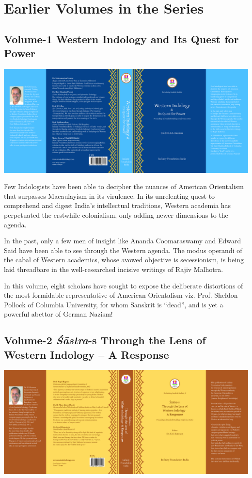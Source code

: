 
\chapter*{Earlier Volumes in the Series}\label{evc}

\section*{Volume-1 Western Indology and Its Quest for Power}

\includegraphics{images/fig01.png}

Few Indologists have been able to decipher the nuances of American Orientalism that surpasses Macaulayism in its virulence. In its unrelenting quest to comprehend and digest India’s intellectual traditions, Western academia has perpetuated the erstwhile colonialism, only adding newer dimensions to the agenda. 

In the past, only a few men of insight like Ananda Coomaraswamy and Edward Said have been able to see through the Western agenda. The modus operandi of the cabal of Western academics, whose avowed objective is secessionism, is being laid threadbare in the well-researched incisive writings of Rajiv Malhotra.

In this volume, eight scholars have sought to expose the deliberate distortions of the most formidable representative of American Orientalism viz. Prof. Sheldon Pollock of Columbia University, for whom Sanskrit is “dead”, and is yet a powerful abettor of German Nazism!


\section*{Volume-2 \textit{Śāstra}-s Through the Lens of Western Indology – A Response}

\includegraphics{images/fig02.png}


